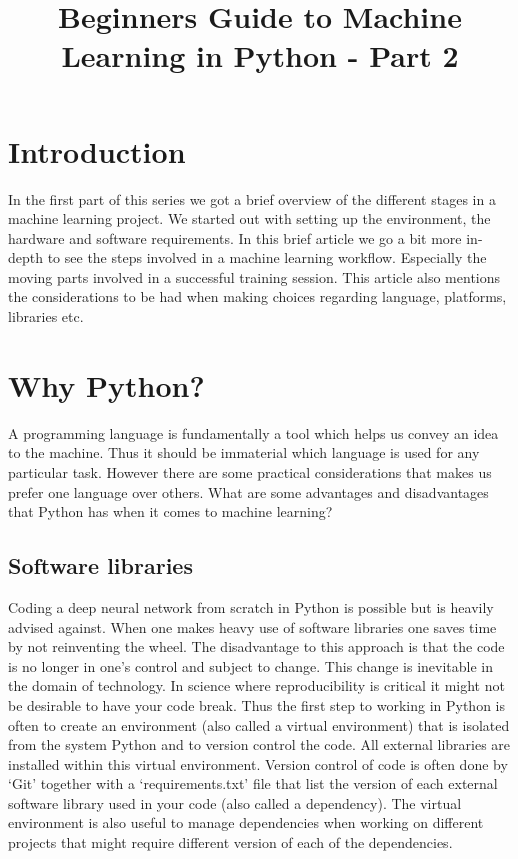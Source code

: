 \documentclass{../template/texnote}
\title{\textbf{Beginners Guide to Machine Learning in Python - Part 2}}[author={Linn Abraham}]
\begin{document}
    \maketitle {}

\section{Introduction}
In the first part of this series we got a brief overview of the different stages in a machine learning project. We started out with setting up the environment, the hardware and software requirements. In this brief article we go a bit more in-depth to see the steps involved in a machine learning workflow. Especially the moving parts involved in a successful training session. This article also mentions the considerations to be had when making choices regarding language, platforms, libraries etc. 

\section{Why Python?}

A programming language is fundamentally a tool which helps us convey an idea to the machine. Thus it should be immaterial which language is used for any particular task. However there are some practical considerations that makes us prefer one language over others. What are some advantages and disadvantages that Python has when it comes to machine learning?

\subsection{Software libraries}

Coding a deep neural network from scratch in Python is possible but is heavily advised against. When one makes heavy use of software libraries one saves time by not reinventing the wheel. The disadvantage to this approach is that the code is no longer in one’s control and subject to change. This change is inevitable in the domain of technology. In science where reproducibility is critical it might not be desirable to have your code break.  Thus the first step to working in Python is often to create an environment (also called a virtual environment) that is isolated from the system Python and to version control the code.  All external libraries are installed within this virtual environment. Version control of code is often done by `Git' together with a `requirements.txt' file that list the version of each external software library used in your code (also called a dependency). The virtual environment is  also useful to manage dependencies when working on different projects that might require different version of each of the dependencies.
\end{document}
